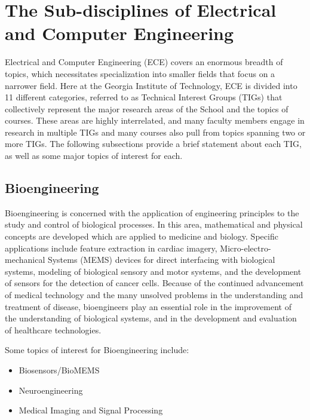 \documentclass[12pt]{article}
\begin{document}
\MakeLabTop

\section{The Sub-disciplines of Electrical and Computer Engineering}

Electrical and Computer Engineering (ECE) covers an enormous breadth of topics, which necessitates specialization into smaller fields that focus on a narrower field. Here at the Georgia Institute of Technology, ECE is divided into 11 different categories, referred to as Technical Interest Groups (TIGs) that collectively represent the major research areas of the School and the topics of courses. These areas are highly interrelated, and many faculty members engage in research in multiple TIGs and many courses also pull from topics spanning two or more TIGs. The following subsections provide a brief statement about each TIG, as well as some major topics of interest for each.

\newpage

\subsection{Bioengineering}

Bioengineering is concerned with the application of engineering principles to the study and control of biological processes. In this area, mathematical and physical concepts are developed which are applied to medicine and biology. Specific applications include feature extraction in cardiac imagery, Micro-electro-mechanical Systems (MEMS) devices for direct interfacing with biological systems, modeling of biological sensory and motor systems, and the development of sensors for the detection of cancer cells. Because of the continued advancement of medical technology and the many unsolved problems in the understanding and treatment of disease, bioengineers play an essential role in the improvement of the understanding of biological systems, and in the development and evaluation of healthcare technologies.

Some topics of interest for Bioengineering include:

\begin{itemize}
    \item Biosensors/BioMEMS
    \item Neuroengineering
    \item Medical Imaging and Signal Processing
\end{itemize}
\end{document}

